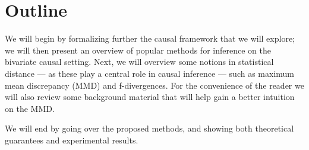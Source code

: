\section{Outline}

We will begin by formalizing further the causal framework that we will explore; we will then present an overview of 
popular methods for inference on the bivariate causal setting. Next, we will overview some notions in statistical distance 
--- as these play a central role in causal inference --- such as maximum mean discrepancy (MMD) and f-divergences. 
For the convenience of the reader we will also review some background material that will help gain a better 
intuition on the MMD. 

We will end by going over the proposed methods, and showing both theoretical guarantees and experimental results. 




